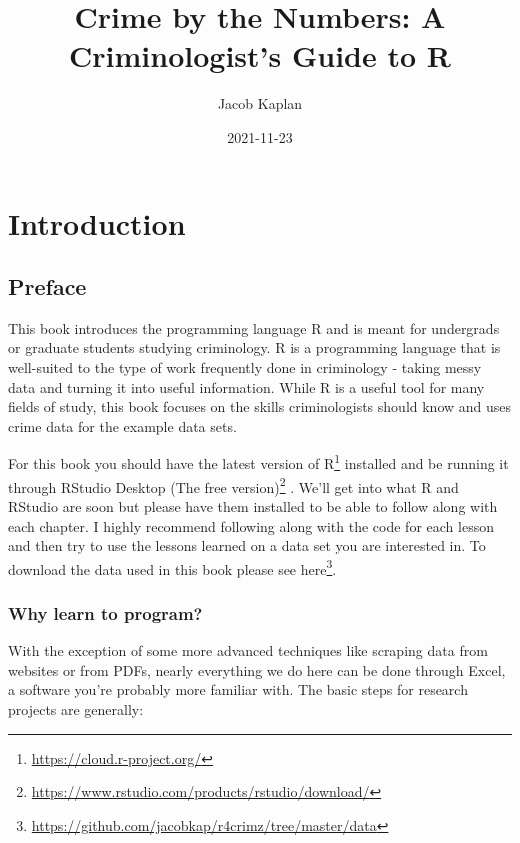 \documentclass[
]{krantz}
\title{Crime by the Numbers: A Criminologist's Guide to R}
\author{Jacob Kaplan}
\date{2021-11-23}
\renewcommand{\href}[2]{#2\footnote{\url{#1}}}
\begin{document}
\maketitle

{
\hypersetup{linkcolor=}
\setcounter{tocdepth}{2}
\tableofcontents
}
\mainmatter

\hypertarget{part-introduction}{%
\part{Introduction}\label{part-introduction}}

\hypertarget{preface}{%
\chapter{Preface}\label{preface}}

This book introduces the programming language R and is meant for undergrads or graduate students studying criminology. R is a programming language that is well-suited to the type of work frequently done in criminology - taking messy data and turning it into useful information. While R is a useful tool for many fields of study, this book focuses on the skills criminologists should know and uses crime data for the example data sets.

For this book you should have the latest version of \href{https://cloud.r-project.org/}{R} installed and be running it through \href{https://www.rstudio.com/products/rstudio/download/}{RStudio Desktop (The free version)} . We'll get into what R and RStudio are soon but please have them installed to be able to follow along with each chapter. I highly recommend following along with the code for each lesson and then try to use the lessons learned on a data set you are interested in. To download the data used in this book please see \href{https://github.com/jacobkap/r4crimz/tree/master/data}{here}.

\hypertarget{why-learn-to-program}{%
\section{Why learn to program?}\label{why-learn-to-program}}

With the exception of some more advanced techniques like scraping data from websites or from PDFs, nearly everything we do here can be done through Excel, a software you're probably more familiar with. The basic steps for research projects are generally:
\end{document}
